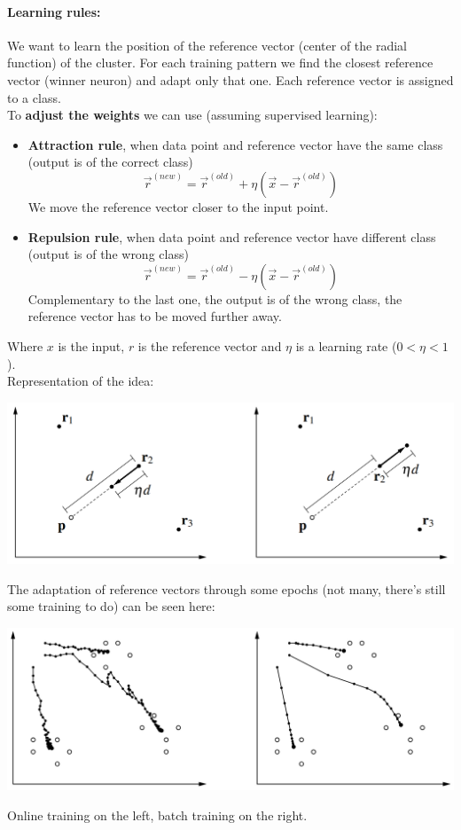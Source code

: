 \documentclass[11pt]{article}
\begin{document}
		\paragraph{Learning rules:} We want to learn the position of the reference vector (center of the radial function) of the cluster. For each training pattern we find the closest reference vector (winner neuron) and adapt only that one. Each reference vector is assigned to a class.\\
		
		To \textbf{adjust the weights} we can use (assuming supervised learning):
		\begin{itemize}
			\item \textbf{Attraction rule}, when data point and reference vector have the same class (output is of the correct class)
			$$ \vec{r}^{(new)} = \vec{r}^{(old)} + \eta \left(\vec{x} - \vec{r}^{(old)}\right)$$
			We move the reference vector closer to the input point.\\
			
			\item \textbf{Repulsion rule}, when data point and reference vector have different class (output is of the wrong class)
			$$ \vec{r}^{(new)} = \vec{r}^{(old)} - \eta \left(\vec{x} - \vec{r}^{(old)}\right)$$
			Complementary to the last one, the output is of the wrong class, the reference vector has to be moved further away.\\
		\end{itemize}
		
		Where $x$ is the input, $r$ is the reference vector and $\eta$ is a learning rate ($0 < \eta < 1$).\\
		
		Representation of the idea:
		\begin{center}
			\includegraphics[width=0.9\columnwidth]{img/NN/LVQ1}
		\end{center}
		
		\newpage
		
		The adaptation of reference vectors through some epochs (not many, there's still some training to do) can be seen here:
		\begin{center}
			\includegraphics[width=0.9\columnwidth]{img/NN/LVQ2}
		\end{center}
		Online training on the left, batch training on the right.\\
		
\end{document}

